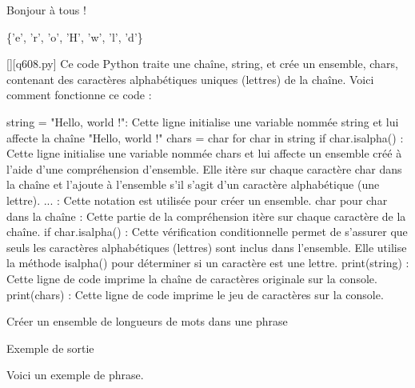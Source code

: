 Bonjour à tous !

\{'e', 'r', 'o', 'H', 'w', 'l', 'd'\}
        \par
        \begin{solution}
            \renewcommand{\nomfichier}{q608.py}
            \pythonfile{\chemincode \nomfichier}[][\nomfichier]
            Ce code Python traite une chaîne, string, et crée un ensemble, chars, contenant des caractères alphabétiques uniques (lettres) de la chaîne. Voici comment fonctionne ce code :

    string = "Hello, world !": Cette ligne initialise une variable nommée string et lui affecte la chaîne "Hello, world !"
    chars = {char for char in string if char.isalpha()} : Cette ligne initialise une variable nommée chars et lui affecte un ensemble créé à l'aide d'une compréhension d'ensemble. Elle itère sur chaque caractère char dans la chaîne et l'ajoute à l'ensemble s'il s'agit d'un caractère alphabétique (une lettre).
        {...} : Cette notation est utilisée pour créer un ensemble.
        char pour char dans la chaîne : Cette partie de la compréhension itère sur chaque caractère de la chaîne.
        if char.isalpha() : Cette vérification conditionnelle permet de s'assurer que seuls les caractères alphabétiques (lettres) sont inclus dans l'ensemble. Elle utilise la méthode isalpha() pour déterminer si un caractère est une lettre.
    print(string) : Cette ligne de code imprime la chaîne de caractères originale sur la console.
    print(chars) : Cette ligne de code imprime le jeu de caractères sur la console.
        \end{solution}
        

        \question
        Créer un ensemble de longueurs de mots dans une phrase

Exemple de sortie

Voici un exemple de phrase.


